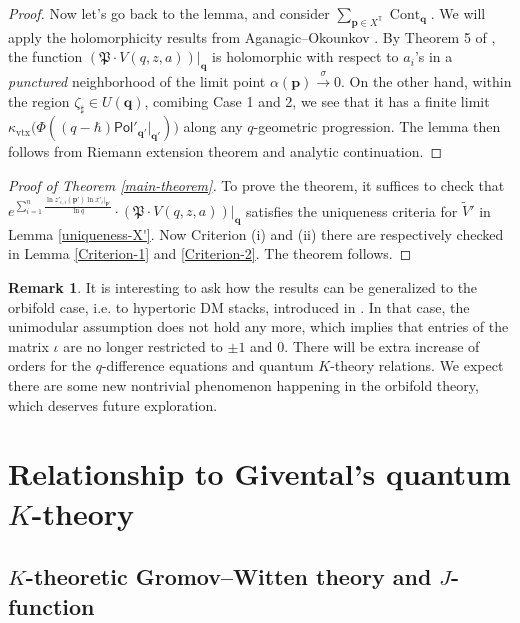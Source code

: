 \documentclass[10pt]{amsart}
\theoremstyle{definition}
\def\TT{\mathbb{T}}
\newcommand{\bp}{\mathbf{p}}
\newcommand{\bq}{\mathbf{q}}
\newcommand{\Cont}{\operatorname{Cont}}
\newcommand{\fP}{\mathfrak{P}}
\newcommand{\Pol}{\mathsf{Pol}}
\theoremstyle{definition}
\newtheorem{Remark}[Definition]{Remark}
\numberwithin{equation}{section}
\theoremstyle{Theorem}
\begin{document}
\begin{proof}
Now let's go back to the lemma, and consider $\sum_{\bp\in X^\TT} \Cont_\bq$. We will apply the holomorphicity results from Aganagic--Okounkov \cite{AOelliptic}. By Theorem 5 of \cite{AOelliptic}, the function $( \fP \cdot V(q, z, a) ) |_\bq $ is holomorphic with respect to $a_i$'s in a \emph{punctured} neighborhood of the limit point $\alpha (\bp) \xrightarrow{\sigma} 0$. On the other hand, within the region $\zeta_\sharp \in U(\bq)$, comibing Case 1 and 2, we see that it has a finite limit $\kappa_{\mathrm{vtx}} \Big( \Phi ((q-\hbar) \Pol'_{\bq'} |_{\bq'} ) \Big)$ along any $q$-geometric progression. The lemma then follows from Riemann extension theorem and analytic continuation.
\end{proof}

\begin{proof}[Proof of Theorem \ref{main-theorem}]

To prove the theorem, it suffices to check that $e^{\sum_{i=1}^n \frac{\ln z'_{\epsilon, i} (\bp') \ln x'_i |_{\bp'}}{\ln q} } \cdot (\fP \cdot V(q,z,a) ) \big|_\bq$ satisfies the uniqueness criteria for $\widetilde V'$ in Lemma \ref{uniqueness-X'}. Now Criterion (i) and (ii) there are respectively checked in Lemma \ref{Criterion-1} and \ref{Criterion-2}. The theorem follows.
\end{proof}

\begin{Remark}
It is interesting to ask how the results can be generalized to the orbifold case, i.e. to hypertoric DM stacks, introduced in \cite{JT-1, JT-2}.
In that case, the unimodular assumption does not hold any more, which implies that entries of the matrix $\iota$ are no longer restricted to $\pm 1$ and $0$. 
There will be extra increase of orders for the $q$-difference equations and quantum $K$-theory relations.
We expect there are some new nontrivial phenomenon happening in the orbifold theory, which deserves future exploration. 
\end{Remark}








\section{Relationship to Givental's quantum $K$-theory}


\subsection{$K$-theoretic Gromov--Witten theory and $J$-function}
\end{document}
